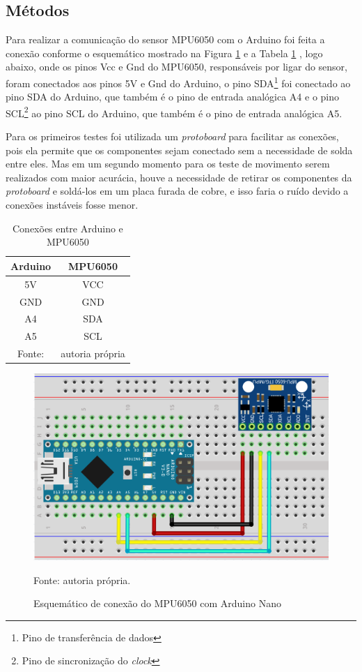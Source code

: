 	\subsection{Métodos}
		
		Para realizar a comunicação do sensor MPU6050 com o Arduino foi feita a conexão conforme o esquemático mostrado na Figura \ref{conexoes} e a Tabela \ref{conexoes_arduino} , logo abaixo, onde os pinos Vcc e Gnd do MPU6050, responsáveis por ligar do sensor, foram conectados aos pinos 5V e Gnd do Arduino, o pino SDA\footnote{Pino de transferência de dados} foi conectado ao pino SDA do Arduino, que também é o pino de entrada analógica A4 e o pino SCL\footnote{Pino de sincronização do \textit{clock}} ao pino SCL do Arduino, que também é o pino de entrada analógica A5.  
		
		Para os primeiros testes foi utilizada um \textit{protoboard} para facilitar as conexões, pois ela permite que os componentes sejam conectado sem a necessidade de solda entre eles. Mas em um segundo momento para os teste de movimento serem realizados com maior acurácia, houve a necessidade de retirar os componentes da \textit{protoboard} e soldá-los em um placa furada de cobre, e isso faria o ruído devido a conexões instáveis fosse menor.
		\begin{table}[h] \footnotesize
			\centering
			\caption{Conexões entre Arduino e MPU6050}
			\label{conexoes_arduino}
			
			\begin{tabular}{cc}
				\toprule
				\textbf{Arduino} & \textbf{MPU6050} \\
				\midrule
				5V & VCC \\
				GND & GND \\
				A4 & SDA \\
				A5 & SCL \\
				\bottomrule
				Fonte: & autoria própria
			\end{tabular}
		\end{table}
		
		\begin{figure}[h]
			\centering
			\includegraphics[keepaspectratio=true,scale=0.5]{figuras/conexoes_mpu_arduino.PNG}
			\caption{ Esquemático de conexão do MPU6050 com Arduino Nano }
			Fonte: autoria própria. \footnotesize
			\label{conexoes}	
		\end{figure}
		
